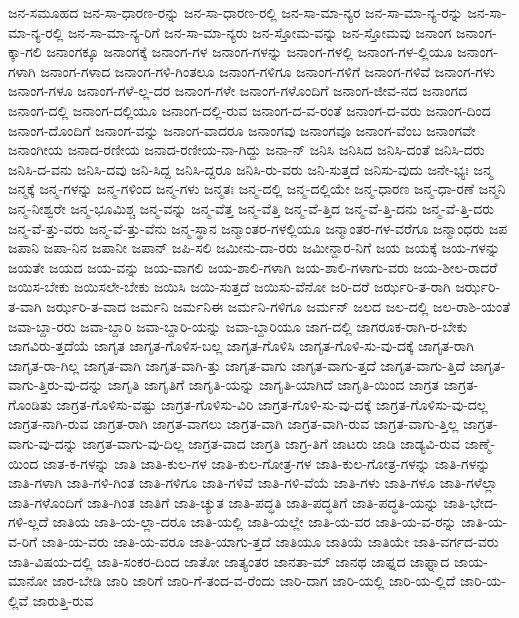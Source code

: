 {ಜನ-ಸಮೂಹದ
ಜನ-ಸಾ-ಧಾರಣ-ರನ್ನು
ಜನ-ಸಾ-ಧಾರಣ-ರಲ್ಲಿ
ಜನ-ಸಾ-ಮಾ-ನ್ಯರ
ಜನ-ಸಾ-ಮಾ-ನ್ಯ-ರನ್ನು
ಜನ-ಸಾ-ಮಾ-ನ್ಯ-ರಲ್ಲಿ
ಜನ-ಸಾ-ಮಾ-ನ್ಯ-ರಿಗೆ
ಜನ-ಸಾ-ಮಾ-ನ್ಯರು
ಜನ-ಸ್ತೋಮ-ವನ್ನು
ಜನ-ಸ್ತೋಮವು
ಜನಾಂಗ
ಜನಾಂಗ-ಕ್ಕಾ-ಗಲಿ
ಜನಾಂಗಕ್ಕೂ
ಜನಾಂಗಕ್ಕೆ
ಜನಾಂಗ-ಗಳ
ಜನಾಂಗ-ಗಳನ್ನು
ಜನಾಂಗ-ಗಳಲ್ಲಿ
ಜನಾಂಗ-ಗಳ-ಲ್ಲಿಯೂ
ಜನಾಂಗ-ಗಳಾಗಿ
ಜನಾಂಗ-ಗಳಾದ
ಜನಾಂಗ-ಗಳಿ-ಗಿಂತಲೂ
ಜನಾಂಗ-ಗಳಿಗೂ
ಜನಾಂಗ-ಗಳಿಗೆ
ಜನಾಂಗ-ಗಳಿವೆ
ಜನಾಂಗ-ಗಳು
ಜನಾಂಗ-ಗಳೂ
ಜನಾಂಗ-ಗಳೆ-ಲ್ಲ-ದರ
ಜನಾಂಗ-ಗಳೇ
ಜನಾಂಗ-ಗಳೊಂದಿಗೆ
ಜನಾಂಗ-ಜೀವ-ನದ
ಜನಾಂಗದ
ಜನಾಂಗ-ದಲ್ಲಿ
ಜನಾಂಗ-ದಲ್ಲಿಯೂ
ಜನಾಂಗ-ದಲ್ಲಿ-ರುವ
ಜನಾಂಗ-ದ-ವ-ರಂತೆ
ಜನಾಂಗ-ದ-ವರು
ಜನಾಂಗ-ದಿಂದ
ಜನಾಂಗ-ದೊಂದಿಗೆ
ಜನಾಂಗ-ವನ್ನು
ಜನಾಂಗ-ವಾದರೂ
ಜನಾಂಗವು
ಜನಾಂಗವೂ
ಜನಾಂಗ-ವೆಂಬ
ಜನಾಂಗವೇ
ಜನಾಂಗೀಯ
ಜನಾದ-ರಣೀಯ
ಜನಾದ-ರಣೀಯ-ನಾ-ಗಿದ್ದು
ಜನಾ-ನ್
ಜನಿಸಿ
ಜನಿಸಿದ
ಜನಿಸಿ-ದಂತೆ
ಜನಿಸಿ-ದರು
ಜನಿಸಿ-ದ-ವನು
ಜನಿಸಿ-ದವು
ಜನಿ-ಸಿದ್ದ
ಜನಿಸಿ-ದ್ದರೂ
ಜನಿಸಿ-ರು-ವರು
ಜನಿ-ಸುತ್ತದೆ
ಜನಿಸು-ವುದು
ಜನೇ-ಭ್ಯಃ
ಜನ್ಮ
ಜನ್ಮಕ್ಕೆ
ಜನ್ಮ-ಗಳನ್ನು
ಜನ್ಮ-ಗಳಿಂದ
ಜನ್ಮ-ಗಳು
ಜನ್ಮತಃ
ಜನ್ಮ-ದಲ್ಲಿ
ಜನ್ಮ-ದಲ್ಲಿಯೇ
ಜನ್ಮ-ಧಾರಣ
ಜನ್ಮ-ಧಾ-ರಣೆ
ಜನ್ಮನಿ
ಜನ್ಮ-ನೀಶ್ವರೇ
ಜನ್ಮ-ಭೂಮಿಶ್ಚ
ಜನ್ಮ-ವನ್ನು
ಜನ್ಮ-ವೆತ್ತ
ಜನ್ಮ-ವೆತ್ತಿ
ಜನ್ಮ-ವೆ-ತ್ತಿದ
ಜನ್ಮ-ವೆ-ತ್ತಿ-ದನು
ಜನ್ಮ-ವೆ-ತ್ತಿ-ದರು
ಜನ್ಮ-ವೆ-ತ್ತು-ವರು
ಜನ್ಮ-ವೆ-ತ್ತು-ವೆನು
ಜನ್ಮ-ಸ್ಥಾನ
ಜನ್ಮಾಂತರ-ಗಳಲ್ಲಿಯೂ
ಜನ್ಮಾಂತರ-ಗಳ-ವರೆಗೂ
ಜನ್ಮಾಂಧರು
ಜಪ
ಜಪಾನಿ
ಜಪಾ-ನಿನ
ಜಪಾನೀ
ಜಪಾನ್
ಜಪಿ-ಸಲಿ
ಜಮೀನು-ದಾ-ರರು
ಜಮೀನ್ದಾರ-ನಿಗೆ
ಜಯ
ಜಯಕ್ಕೆ
ಜಯ-ಗಳನ್ನು
ಜಯತೇ
ಜಯದ
ಜಯ-ವನ್ನು
ಜಯ-ವಾಗಲಿ
ಜಯ-ಶಾಲಿ-ಗಳಾಗಿ
ಜಯ-ಶಾಲಿ-ಗಳಾಗು-ವರು
ಜಯ-ಶೀಲ-ರಾದರೆ
ಜಯಿಸ-ಬೇಕು
ಜಯಿಸಲೇ-ಬೇಕು
ಜಯಿಸಿ
ಜಯಿ-ಸುತ್ತದೆ
ಜಯಿಸು-ವೆನೋ
ಜರಿ-ದರೆ
ಜರ್ಝರಿ-ತ-ರಾಗಿ
ಜರ್ಝರಿ-ತ-ವಾಗಿ
ಜರ್ಝರಿ-ತ-ವಾದ
ಜರ್ಮನಿ
ಜರ್ಮನಿಈ
ಜರ್ಮನಿ-ಗಳಿಗೂ
ಜರ್ಮನ್
ಜಲದ
ಜಲ-ದಲ್ಲಿ
ಜಲ-ರಾಶಿ-ಯಂತೆ
ಜವಾ-ಬ್ದಾ-ರರು
ಜವಾ-ಬ್ದಾರಿ
ಜವಾ-ಬ್ದಾರಿ-ಯನ್ನು
ಜವಾ-ಬ್ದಾರಿಯೂ
ಜಾಗ-ದಲ್ಲಿ
ಜಾಗರೂಕ-ರಾಗಿ-ರ-ಬೇಕು
ಜಾಗವಿರು-ತ್ತದೆಯೆ
ಜಾಗೃತ
ಜಾಗೃತ-ಗೊಳಿಸ-ಬಲ್ಲ
ಜಾಗೃತ-ಗೊಳಿಸಿ
ಜಾಗೃತ-ಗೊಳಿ-ಸು-ವು-ದಕ್ಕೆ
ಜಾಗೃತ-ರಾಗಿ
ಜಾಗೃತ-ರಾ-ಗಿಲ್ಲ
ಜಾಗೃತ-ವಾಗಿ
ಜಾಗೃತ-ವಾಗಿ-ತ್ತು
ಜಾಗೃತ-ವಾಗು
ಜಾಗೃತ-ವಾಗು-ತ್ತದೆ
ಜಾಗೃತ-ವಾಗು-ತ್ತಿದೆ
ಜಾಗೃತ-ವಾಗು-ತ್ತಿರು-ವು-ದನ್ನು
ಜಾಗೃತಿ
ಜಾಗೃತಿಗೆ
ಜಾಗೃತಿ-ಯನ್ನು
ಜಾಗೃತಿ-ಯಾಗಿದೆ
ಜಾಗೃತಿ-ಯಿಂದ
ಜಾಗ್ರತ
ಜಾಗ್ರತ-ಗೊಂಡಿತು
ಜಾಗ್ರತ-ಗೊಳಿಸು-ವಷ್ಟು
ಜಾಗ್ರತ-ಗೊಳಿಸು-ವಿರಿ
ಜಾಗ್ರತ-ಗೊಳಿ-ಸು-ವು-ದಕ್ಕೆ
ಜಾಗ್ರತ-ಗೊಳಿಸು-ವು-ದಲ್ಲ
ಜಾಗ್ರತ-ನಾಗಿ-ರುವ
ಜಾಗ್ರತ-ರಾಗಿ
ಜಾಗ್ರತ-ವಾಗಲು
ಜಾಗ್ರತ-ವಾಗಿ
ಜಾಗ್ರತ-ವಾಗಿ-ರುವ
ಜಾಗ್ರತ-ವಾಗು-ತ್ತಿಲ್ಲ
ಜಾಗ್ರತ-ವಾಗು-ವು-ದನ್ನು
ಜಾಗ್ರತ-ವಾಗು-ವು-ದಿಲ್ಲ
ಜಾಗ್ರತ-ವಾದ
ಜಾಗ್ರತಿ
ಜಾಗ್ರ-ತಿಗೆ
ಜಾಟರು
ಜಾಡಿ
ಜಾಡ್ಯವಿ-ರುವ
ಜಾಣ್ಮೆ-ಯಿಂದ
ಜಾತ-ಕ-ಗಳನ್ನು
ಜಾತಿ
ಜಾತಿ-ಕುಲ-ಗಳ
ಜಾತಿ-ಕುಲ-ಗೋತ್ರ-ಗಳ
ಜಾತಿ-ಕುಲ-ಗೋತ್ರ-ಗಳನ್ನು
ಜಾತಿ-ಗಳನ್ನು
ಜಾತಿ-ಗಳಾಗಿ
ಜಾತಿ-ಗಳಿ-ಗಿಂತ
ಜಾತಿ-ಗಳಿಗೂ
ಜಾತಿ-ಗಳಿವೆ
ಜಾತಿ-ಗಳಿ-ವೆಯೆ
ಜಾತಿ-ಗಳು
ಜಾತಿ-ಗಳೂ
ಜಾತಿ-ಗಳೆಲ್ಲಾ
ಜಾತಿ-ಗಳೊಂದಿಗೆ
ಜಾತಿ-ಗಿಂತ
ಜಾತಿಗೆ
ಜಾತಿ-ಚ್ಯುತ
ಜಾತಿ-ಪದ್ಧತಿ
ಜಾತಿ-ಪದ್ಧತಿಗೆ
ಜಾತಿ-ಪದ್ಧತಿ-ಯನ್ನು
ಜಾತಿ-ಭೇದ-ಗಳಿ-ಲ್ಲದೆ
ಜಾತಿಯ
ಜಾತಿ-ಯ-ಲ್ಲಾ-ದರೂ
ಜಾತಿ-ಯಲ್ಲಿ
ಜಾತಿ-ಯಲ್ಲೇ
ಜಾತಿ-ಯ-ವರ
ಜಾತಿ-ಯ-ವ-ರನ್ನು
ಜಾತಿ-ಯ-ವ-ರಿಗೆ
ಜಾತಿ-ಯ-ವರು
ಜಾತಿ-ಯ-ವರೂ
ಜಾತಿ-ಯಾಗು-ತ್ತದೆ
ಜಾತಿಯೂ
ಜಾತಿಯೆ
ಜಾತಿಯೇ
ಜಾತಿ-ವರ್ಗದ-ವರು
ಜಾತಿ-ವಿಷಯ-ದಲ್ಲಿ
ಜಾತಿ-ಸಂಕರ-ದಿಂದ
ಜಾತೋ
ಜಾತ್ಯಂತರ
ಜಾನತಾ-ಮ್
ಜಾನಥ
ಜಾಫ್ನದ
ಜಾಫ್ನಾದ
ಜಾಯ-ಮಾನೋ
ಜಾರ-ಬೇಡಿ
ಜಾರಿ
ಜಾರಿಗೆ
ಜಾರಿ-ಗೆ-ತಂದ-ವ-ರೆಂದು
ಜಾರಿ-ದಾಗ
ಜಾರಿ-ಯಲ್ಲಿ
ಜಾರಿ-ಯ-ಲ್ಲಿದೆ
ಜಾರಿ-ಯ-ಲ್ಲಿವೆ
ಜಾರುತ್ತಿ-ರುವ
}
